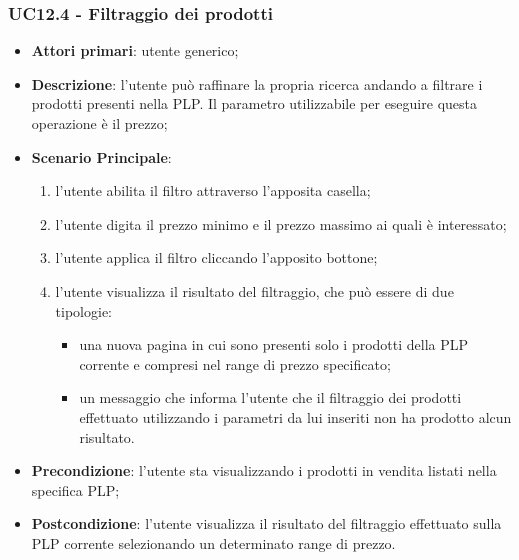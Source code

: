 \subsubsection{UC12.4 - Filtraggio dei prodotti}
\begin{itemize}
\item \textbf{Attori primari}: utente generico;
\item \textbf{Descrizione}: l'utente può raffinare la propria ricerca andando a filtrare i prodotti presenti nella PLP. Il parametro utilizzabile per eseguire questa operazione è il prezzo;
\item \textbf{Scenario Principale}:
\begin{enumerate}
\item l'utente abilita il filtro attraverso l'apposita casella;
\item l'utente digita il prezzo minimo e il prezzo massimo ai quali è interessato;
\item l'utente applica il filtro cliccando l'apposito bottone;
\item l'utente visualizza il risultato del filtraggio, che può essere di due tipologie:
\begin{itemize}
\item una nuova pagina in cui sono presenti solo i prodotti della PLP corrente e compresi nel range di prezzo specificato;
\item un messaggio che informa l'utente che il filtraggio dei prodotti effettuato utilizzando i parametri da lui inseriti non ha prodotto alcun risultato.
\end{itemize}
\end{enumerate}
\item \textbf{Precondizione}: l'utente sta visualizzando i prodotti in vendita listati nella specifica PLP;
\item \textbf{Postcondizione}: l'utente visualizza il risultato del filtraggio effettuato sulla PLP corrente selezionando un determinato range di prezzo.
\end{itemize}

